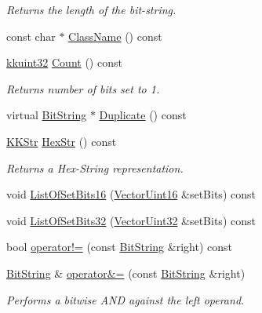\begin{DoxyCompactItemize}
\begin{DoxyCompactList}\small\item\em Returns the length of the bit-\/string. \end{DoxyCompactList}\item 
const char $\ast$ \hyperlink{class_k_k_b_1_1_bit_string_a610a7f712c54ecdde050c4c64e3f460e}{Class\+Name} () const 
\item 
\hyperlink{namespace_k_k_b_af8d832f05c54994a1cce25bd5743e19a}{kkuint32} \hyperlink{class_k_k_b_1_1_bit_string_aff2c39f8780ecdd66261a853652f7bc4}{Count} () const 
\begin{DoxyCompactList}\small\item\em Returns number of bits set to \textquotesingle{}1\textquotesingle{}. \end{DoxyCompactList}\item 
virtual \hyperlink{class_k_k_b_1_1_bit_string}{Bit\+String} $\ast$ \hyperlink{class_k_k_b_1_1_bit_string_afbd70179ae53fb7326b129758e0e6521}{Duplicate} () const 
\item 
\hyperlink{class_k_k_b_1_1_k_k_str}{K\+K\+Str} \hyperlink{class_k_k_b_1_1_bit_string_a100eecb241e6df9b39ce197b5b38f635}{Hex\+Str} () const 
\begin{DoxyCompactList}\small\item\em Returns a Hex-\/\+String representation. \end{DoxyCompactList}\item 
void \hyperlink{class_k_k_b_1_1_bit_string_a445228d8a399dc91cbd409d7a93f687e}{List\+Of\+Set\+Bits16} (\hyperlink{namespace_k_k_b_a4f57cb1872dd1448f1e20798475afc06}{Vector\+Uint16} \&set\+Bits) const 
\item 
void \hyperlink{class_k_k_b_1_1_bit_string_aefe93ad98bf139928d15f55b7e0793ec}{List\+Of\+Set\+Bits32} (\hyperlink{namespace_k_k_b_ab5f0d7bc82b746e1e75e48a6394ccb60}{Vector\+Uint32} \&set\+Bits) const 
\item 
bool \hyperlink{class_k_k_b_1_1_bit_string_a4d11b7cbefa8f1dd80a6f2603e5fe723}{operator!=} (const \hyperlink{class_k_k_b_1_1_bit_string}{Bit\+String} \&right) const 
\item 
\hyperlink{class_k_k_b_1_1_bit_string}{Bit\+String} \& \hyperlink{class_k_k_b_1_1_bit_string_a38b408da033b933e567b66c26c892fe2}{operator\&=} (const \hyperlink{class_k_k_b_1_1_bit_string}{Bit\+String} \&right)
\begin{DoxyCompactList}\small\item\em Performs a bitwise A\+ND against the left operand. \end{DoxyCompactList}\item 

\end{DoxyCompactItemize}
